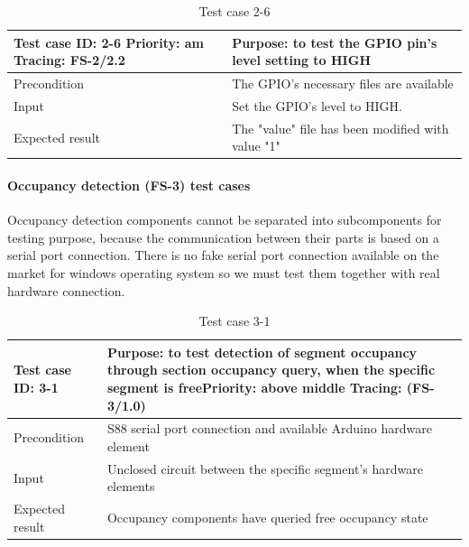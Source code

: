 \begin{table}[H]
	\caption{Test case 2-6}
	\label{table:TCase-FS2-6}
	\begin{center}
		\renewcommand{\arraystretch}{1.8}
		\begin{tabu} 
			to 0.9 \textwidth
			{  X[0.4, c] X[c] }
			\toprule
			Test case ID: 2-6 \newline Priority: am \newline Tracing: FS-2/2.2 & Purpose: to test the GPIO pin's level setting to HIGH \\ \midrule
			Precondition                                                       & The GPIO's necessary files are available              \\
			Input                                                              & Set the GPIO's level to HIGH.                         \\
			Expected result                                                    & The "value" file has been modified with value "1"     \\ \bottomrule
		\end{tabu}
	\end{center}
\end{table} 

\paragraph{Occupancy detection (FS-3) test cases} Occupancy detection components cannot be separated into subcomponents for testing purpose, because the communication between their parts is based on a serial port connection. There is no fake serial port  connection  available on the market for windows operating system so we must test them together with real hardware connection.

\begin{table}[H]
	\caption{Test case 3-1}
	\label{table:TCase-FS3-1}
	\begin{center}
		\renewcommand{\arraystretch}{1.8}
		\begin{tabu} 
			to 0.9 \textwidth
			{  X[0.4, c] X[c] }
			\toprule
			Test case ID: 3-1 & Purpose: to test detection of segment occupancy through section occupancy query, when the specific segment is free\newline Priority: above middle \newline Tracing: (FS-3/1.0)\\ \midrule
			Precondition & S88 serial port connection and available Arduino hardware element \\
			Input & Unclosed circuit between the specific segment's hardware elements  \\
			Expected result & Occupancy components have queried free occupancy state \\ \bottomrule
		\end{tabu}
	\end{center}
\end{table} 

